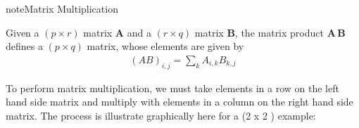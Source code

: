 \documentclass[letterpaper,10pt,english]{jupyterBook}
\begin{document}
\sphinxAtStartPar
{}

\begin{sphinxadmonition}{note}{Matrix Multiplication}

\sphinxAtStartPar
Given a \((p × r)\) matrix \(\boldsymbol{A}\) and a \((r × q)\) matrix \(\boldsymbol{B}\), the matrix product \(\boldsymbol{A\,B}\) defines a \((p × q)\) matrix, whose elements are given by
\begin{equation*}
\begin{split} \left(A B\right)_{i,j} = \sum_k  A_{i,k} B_{k,j} \end{split}
\end{equation*}\end{sphinxadmonition}

\sphinxAtStartPar
To perform matrix multiplication, we must take elements in a row on the left hand side matrix and multiply with elements in a column on the right hand side matrix. The process is illustrate graphically here for a (2 x 2 ) example:

\sphinxAtStartPar
{}
 \label{exercise:q_matrix_multiplication}
\end{document}

